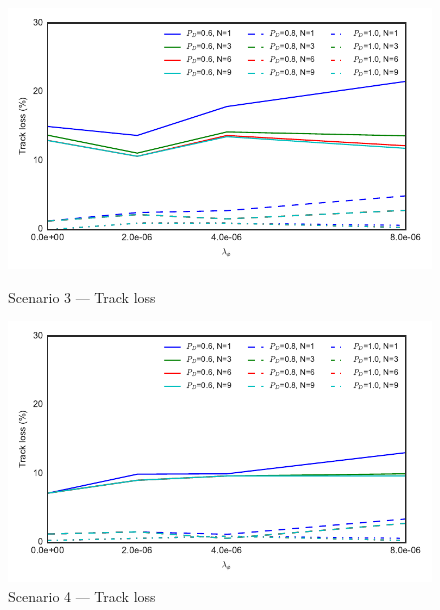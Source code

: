 \begin{figure}
\centering
\includegraphics{Figures/plots/Scenario3_Tracking-TrackLoss.pdf}
\caption{Scenario 3 --- Track loss}\label{fig:scenario3_track_loss}
\includegraphics{Figures/plots/Scenario4_Tracking-TrackLoss.pdf}
\caption{Scenario 4 --- Track loss}\label{fig:scenario4_track_loss}
\end{figure}
